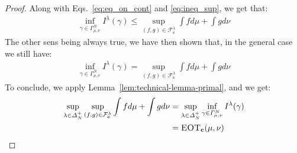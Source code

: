 \begin{proof}
Along with Eqs.~\ref{eq:eq_on_cont} and \ref{eq:ineq_sup}, we get that:
\begin{align*}
\inf_{\gamma\in \Gamma^N_{\mu,\nu}}I^\lambda(\gamma)\leq\sup\limits_{(f,g)\in\mathcal{F}^\lambda_\mathbf{c}}\int fd\mu+\int gd\nu
\end{align*}
The other sens being always true, we have then  shown that, in the general case we still have:
\begin{align*}
    \inf_{\gamma\in \Gamma^N_{\mu,\nu}}I^\lambda(\gamma)=\sup\limits_{(f,g)\in\mathcal{F}^\lambda_\mathbf{c}}\int fd\mu+\int gd\nu
\end{align*}
To conclude, we apply Lemma~\ref{lem:technical-lemma-primal}, and we get: 
\begin{align*}
\sup_{\lambda\in\Delta^+_N} \sup\limits_{(f,g)\in\mathcal{F}^\lambda_\mathbf{c}}\int fd\mu+\int gd\nu &=\sup_{\lambda\in\Delta^+_N} \inf_{\gamma\in \Gamma^N_{\mu,\nu}}I^\lambda(\gamma)\\
&= \textsc{EOT}_\mathbf{c}(\mu,\nu)\\
\end{align*}


\end{proof}




